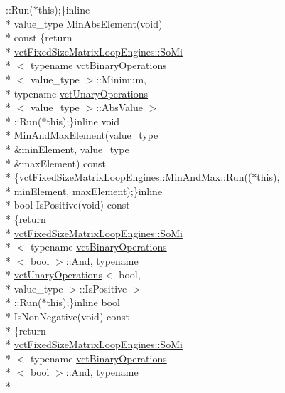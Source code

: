 \begin{DoxyCompactItemize}
\-::Run($\ast$this);\}inline \\*
value\-\_\-type Min\-Abs\-Element(void) \\*
const \{return \\*
\hyperlink{classvct_fixed_size_matrix_loop_engines_1_1_so_mi}{vct\-Fixed\-Size\-Matrix\-Loop\-Engines\-::\-So\-Mi}\\*
$<$ typename \hyperlink{classvct_binary_operations}{vct\-Binary\-Operations}\\*
$<$ value\-\_\-type $>$\-::Minimum, \\*
typename \hyperlink{classvct_unary_operations}{vct\-Unary\-Operations}\\*
$<$ value\-\_\-type $>$\-::Abs\-Value $>$\\*
\-::Run($\ast$this);\}inline void \\*
Min\-And\-Max\-Element(value\-\_\-type \\*
\&min\-Element, value\-\_\-type \\*
\&max\-Element) const \\*
\{\hyperlink{classvct_fixed_size_matrix_loop_engines_1_1_min_and_max_ac741cdb4fecf6e19498d59b7d9ee6354}{vct\-Fixed\-Size\-Matrix\-Loop\-Engines\-::\-Min\-And\-Max\-::\-Run}(($\ast$this), \\*
min\-Element, max\-Element);\}inline \\*
bool Is\-Positive(void) const \\*
\{return \\*
\hyperlink{classvct_fixed_size_matrix_loop_engines_1_1_so_mi}{vct\-Fixed\-Size\-Matrix\-Loop\-Engines\-::\-So\-Mi}\\*
$<$ typename \hyperlink{classvct_binary_operations}{vct\-Binary\-Operations}\\*
$<$ bool $>$\-::And, typename \\*
\hyperlink{classvct_unary_operations}{vct\-Unary\-Operations}$<$ bool, \\*
value\-\_\-type $>$\-::Is\-Positive $>$\\*
\-::Run($\ast$this);\}inline bool \\*
Is\-Non\-Negative(void) const \\*
\{return \\*
\hyperlink{classvct_fixed_size_matrix_loop_engines_1_1_so_mi}{vct\-Fixed\-Size\-Matrix\-Loop\-Engines\-::\-So\-Mi}\\*
$<$ typename \hyperlink{classvct_binary_operations}{vct\-Binary\-Operations}\\*
$<$ bool $>$\-::And, typename \\*

\end{DoxyCompactItemize}
